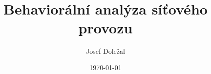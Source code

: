 \documentclass[czech]{article}
\author{Josef Doležal}
\date{\today}
\title{Behaviorální analýza síťového provozu}
\begin{document}

\makeatletter
\begin{titlepage}

    

\end{titlepage}








\newpage


\nocite{*}


\end{document}
